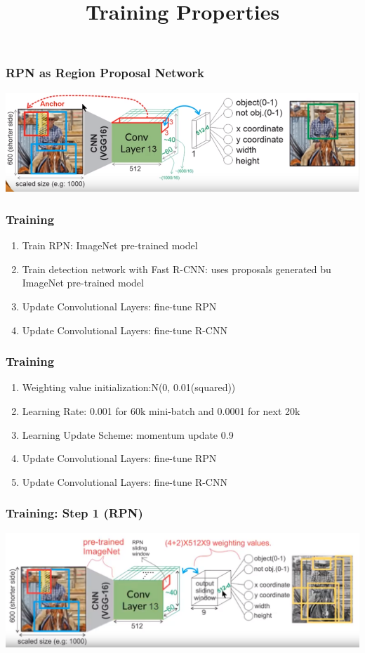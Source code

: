 \documentclass{beamer}
\begin{document}
    
    
    
     \begin{frame}
       \frametitle{RPN as Region Proposal Network}
       \centering
         \includegraphics[width=1.0\textwidth]{images/rpnRP.PNG}
    \end{frame}
    
    
    \begin{frame}
       \frametitle{Training}
         \begin{enumerate}
             \item Train RPN: ImageNet pre-trained model
             \item Train detection network with Fast R-CNN: uses proposals generated bu ImageNet pre-trained model
             \item Update Convolutional Layers: fine-tune RPN
             \item Update Convolutional Layers: fine-tune R-CNN
         \end{enumerate}
    \end{frame}
    
    \begin{frame}
       \frametitle{Training}
         \title{Training Properties}
         \begin{enumerate}
             \item Weighting value initialization:N(0, 0.01(squared))
             \item Learning Rate: 0.001 for 60k mini-batch and 0.0001 for next 20k
             \item Learning Update Scheme: momentum update 0.9
             \item Update Convolutional Layers: fine-tune RPN
             \item Update Convolutional Layers: fine-tune R-CNN
         \end{enumerate}
    \end{frame}
    
    \begin{frame}
       \frametitle{Training: Step 1 (RPN)}
       \centering
         \includegraphics[width=1.0\textwidth]{images/training.PNG}
    \end{frame}
    
\end{document}
